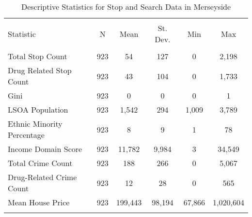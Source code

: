 
\begin{table}[!htbp] \centering 
  \caption{Descriptive Statistics for Stop and Search Data in Merseyside} 
  \label{tab:descriptive_merseyside} 
\begin{tabular}{@{\extracolsep{5pt}}lccccc} 
\\[-1.8ex]\hline 
\hline \\[-1.8ex] 
Statistic & \multicolumn{1}{c}{N} & \multicolumn{1}{c}{Mean} & \multicolumn{1}{c}{St. Dev.} & \multicolumn{1}{c}{Min} & \multicolumn{1}{c}{Max} \\ 
\hline \\[-1.8ex] 
Total Stop Count & 923 & 54 & 127 & 0 & 2,198 \\ 
Drug Related Stop Count & 923 & 43 & 104 & 0 & 1,733 \\ 
Gini & 923 & 0 & 0 & 0 & 1 \\ 
LSOA Population & 923 & 1,542 & 294 & 1,009 & 3,789 \\ 
Ethnic Minority Percentage & 923 & 8 & 9 & 1 & 78 \\ 
Income Domain Score & 923 & 11,782 & 9,984 & 3 & 34,549 \\ 
Total Crime Count & 923 & 188 & 266 & 0 & 5,067 \\ 
Drug-Related Crime Count & 923 & 12 & 28 & 0 & 565 \\ 
Mean House Price & 923 & 199,443 & 98,194 & 67,866 & 1,020,604 \\ 
\hline \\[-1.8ex] 
\end{tabular} 
\end{table} 
